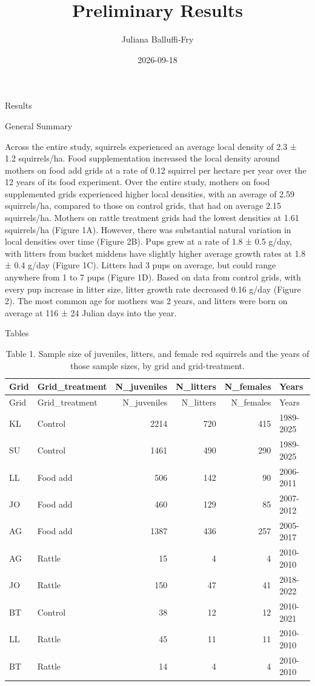 \documentclass[
]{article}
\title{Preliminary Results}
\author{Juliana Balluffi-Fry}
\date{2026-09-18}
\begin{document}
\maketitle

Results

General Summary

Across the entire study, squirrels experienced an average local density
of 2.3 ± 1.2 squirrels/ha. Food supplementation increased the local
density around mothers on food add grids at a rate of 0.12 squirrel per
hectare per year over the 12 years of its food experiment. Over the
entire study, mothers on food supplemented grids experienced higher
local densities, with an average of 2.59 squirrels/ha, compared to those
on control grids, that had on average 2.15 squirrels/ha. Mothers on
rattle treatment grids had the lowest densities at 1.61 squirrels/ha
(Figure 1A). However, there was substantial natural variation in local
densities over time (Figure 2B). Pups grew at a rate of 1.8 ± 0.5 g/day,
with litters from bucket middens have slightly higher average growth
rates at 1.8 ± 0.4 g/day (Figure 1C). Litters had 3 pups on average, but
could range anywhere from 1 to 7 pups (Figure 1D). Based on data from
control grids, with every pup increase in litter size, litter growth
rate decreased 0.16 g/day (Figure 2). The most common age for mothers
was 2 years, and litters were born on average at 116 ± 24 Julian days
into the year.

Tables

\begin{longtable}[]{@{}llrrrl@{}}
\caption{Table 1. Sample size of juveniles, litters, and female red
squirrels and the years of those sample sizes, by grid and
grid-treatment.}\tabularnewline
\toprule\noalign{}
Grid & Grid\_treatment & N\_juveniles & N\_litters & N\_females &
Years \\
\midrule\noalign{}
\endfirsthead
\toprule\noalign{}
Grid & Grid\_treatment & N\_juveniles & N\_litters & N\_females &
Years \\
\midrule\noalign{}
\endhead
\bottomrule\noalign{}
\endlastfoot
KL & Control & 2214 & 720 & 415 & 1989-2025 \\
SU & Control & 1461 & 490 & 290 & 1989-2025 \\
LL & Food add & 506 & 142 & 90 & 2006-2011 \\
JO & Food add & 460 & 129 & 85 & 2007-2012 \\
AG & Food add & 1387 & 436 & 257 & 2005-2017 \\
AG & Rattle & 15 & 4 & 4 & 2010-2010 \\
JO & Rattle & 150 & 47 & 41 & 2018-2022 \\
BT & Control & 38 & 12 & 12 & 2010-2021 \\
LL & Rattle & 45 & 11 & 11 & 2010-2010 \\
BT & Rattle & 14 & 4 & 4 & 2010-2010 \\
\end{longtable}
\end{document}
